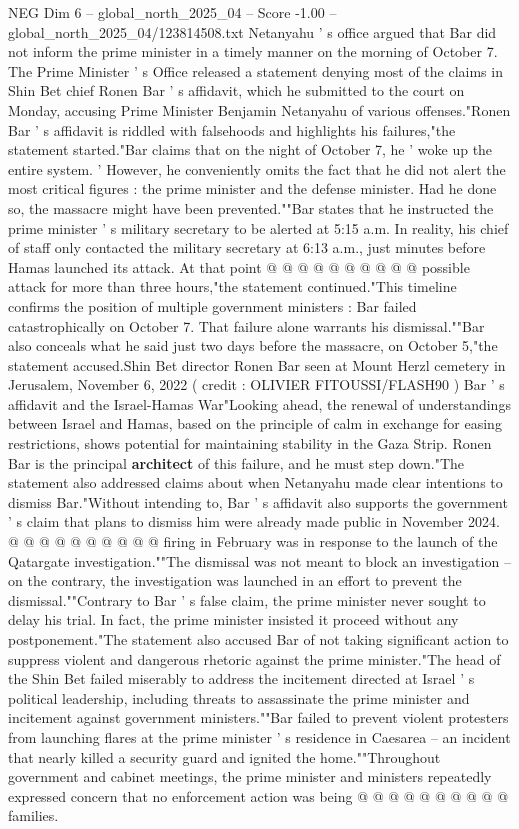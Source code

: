 \begin{textsample}{NEG Dim 6 – global\_north\_2025\_04 – Score -1.00 – global\_north\_2025\_04/123814508.txt}  \label{ex:f6_neg_236}
Netanyahu ' s office argued that Bar did not inform the prime minister in a timely manner on the morning of October 7.
The Prime Minister ' s Office released a statement denying most of the claims in Shin Bet chief Ronen Bar ' s affidavit, which he submitted to the court on Monday, accusing Prime Minister Benjamin Netanyahu of various offenses."Ronen Bar ' s affidavit is riddled with falsehoods and highlights his failures,"the statement started."Bar claims that on the night of October 7, he ' woke up the entire system. ' However, he conveniently omits the fact that he did not alert the most critical figures : the prime minister and the defense minister.
Had he done so, the massacre might have been prevented.""Bar states that he instructed the prime minister ' s military secretary to be alerted at 5:15 a.m.
In reality, his chief of staff only contacted the military secretary at 6:13 a.m., just minutes before Hamas launched its attack.
At that point @ @ @ @ @ @ @ @ @ @ possible attack for more than three hours,"the statement continued."This timeline confirms the position of multiple government ministers : Bar failed catastrophically on October 7.
That failure alone warrants his dismissal.""Bar also conceals what he said just two days before the massacre, on October 5,"the statement accused.Shin Bet director Ronen Bar seen at Mount Herzl cemetery in Jerusalem, November 6, 2022 ( credit : OLIVIER FITOUSSI/FLASH90 ) Bar ' s affidavit and the Israel-Hamas War"Looking ahead, the renewal of understandings between Israel and Hamas, based on the principle of calm in exchange for easing restrictions, shows potential for maintaining stability in the Gaza Strip.
Ronen Bar is the principal \textbf{architect} of this failure, and he must step down."The statement also addressed claims about when Netanyahu made clear intentions to dismiss Bar."Without intending to, Bar ' s affidavit also supports the government ' s claim that plans to dismiss him were already made public in November 2024. @ @ @ @ @ @ @ @ @ @ firing in February was in response to the launch of the Qatargate investigation.""The dismissal was not meant to block an investigation -- on the contrary, the investigation was launched in an effort to prevent the dismissal.""Contrary to Bar ' s false claim, the prime minister never sought to delay his trial.
In fact, the prime minister insisted it proceed without any postponement."The statement also accused Bar of not taking significant action to suppress violent and dangerous rhetoric against the prime minister."The head of the Shin Bet failed miserably to address the incitement directed at Israel ' s political leadership, including threats to assassinate the prime minister and incitement against government ministers.""Bar failed to prevent violent protesters from launching flares at the prime minister ' s residence in Caesarea -- an incident that nearly killed a security guard and ignited the home.""Throughout government and cabinet meetings, the prime minister and ministers repeatedly expressed concern that no enforcement action was being @ @ @ @ @ @ @ @ @ @ families.

\end{textsample}

